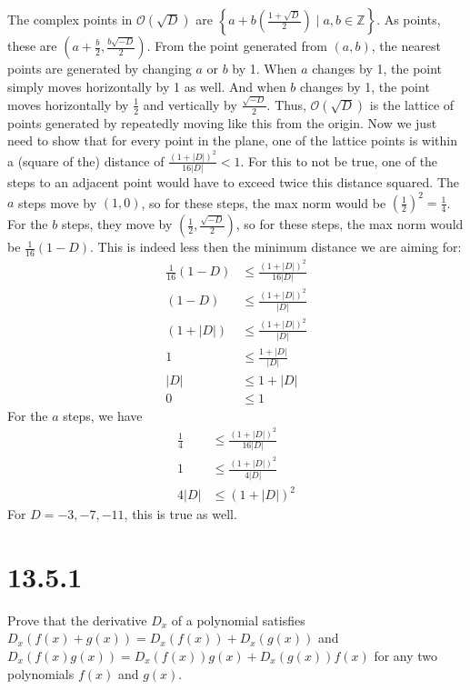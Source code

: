 \documentclass[fleqn]{article}
\begin{document}
        The complex points in $\mathcal{O}\left(\sqrt{D}\right)$ are $\left\{a + b\left(\frac{1 + \sqrt{D}}{2}\right) \mid a, b \in \mathbb{Z}\right\}$.  As points, these are $\left(a + \frac{b}{2}, \frac{b \sqrt{-D}}{2}\right)$.  From the point generated from $(a, b)$, the nearest points are generated by changing $a$ or $b$ by 1.  When $a$ changes by 1, the point simply moves horizontally by 1 as well.  And when $b$ changes by 1, the point moves horizontally by $\frac{1}{2}$ and vertically by $\frac{\sqrt{-D}}{2}$.  Thus, $\mathcal{O}\left(\sqrt{D}\right)$ is the lattice of points generated by repeatedly moving like this from the origin.  Now we just need to show that for every point in the plane, one of the lattice points is within a (square of the) distance of $\frac{(1 + |D|)^2}{16 |D|} < 1$.  For this to not be true, one of the steps to an adjacent point would have to exceed twice this distance squared.  The $a$ steps move by $(1, 0)$, so for these steps, the max norm would be $\left(\frac{1}{2}\right)^2 = \frac{1}{4}$.  For the $b$ steps, they move by $\left(\frac{1}{2}, \frac{\sqrt{-D}}{2}\right)$, so for these steps, the max norm would be $\frac{1}{16}(1 - D)$.  This is indeed less then the minimum distance we are aiming for:
        \begin{align}
            \frac{1}{16} (1 - D) &\leq \frac{(1 + |D|)^2}{16 |D|} \\
            (1 - D) &\leq \frac{(1 + |D|)^2}{|D|} \\
            (1 + |D|) &\leq \frac{(1 + |D|)^2}{|D|} \\
            1 &\leq \frac{1 + |D|}{|D|} \\
            |D| &\leq 1 + |D| \\
            0 &\leq 1
        \end{align}
        For the $a$ steps, we have
        \begin{align}
            \frac{1}{4} &\leq \frac{(1 + |D|)^2}{16 |D|} \\
            1 &\leq \frac{(1 + |D|)^2}{4 |D|} \\
            4 |D| &\leq (1 + |D|)^2
        \end{align}
        For $D = -3, -7, -11$, this is true as well.

    \section{13.5.1}
    Prove that the derivative $D_x$ of a polynomial satisfies $D_x(f(x) + g(x)) = D_x(f(x)) + D_x(g(x))$ and $D_x(f(x)g(x)) = D_x(f(x))g(x) + D_x(g(x))f(x)$ for any two polynomials $f(x)$ and $g(x)$.
        
\end{document}
